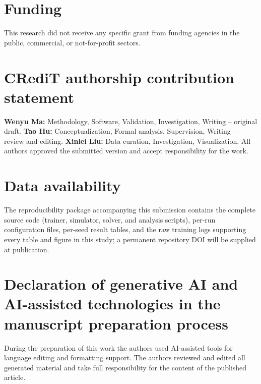 \documentclass[preprint,12pt]{elsarticle}
\begin{document}
\section*{Funding}
This research did not receive any specific grant from funding agencies in the public, commercial, or not-for-profit sectors.

\section*{CRediT authorship contribution statement}
\textbf{Wenyu Ma:} Methodology, Software, Validation, Investigation, Writing -- original draft.
\textbf{Tao Hu:} Conceptualization, Formal analysis, Supervision, Writing -- review and editing.
\textbf{Xinlei Liu:} Data curation, Investigation, Visualization.
All authors approved the submitted version and accept responsibility for the work.

\section*{Data availability}
The reproducibility package accompanying this submission contains the complete source code (trainer, simulator, solver, and analysis scripts), per-run configuration files, per-seed result tables, and the raw training logs supporting every table and figure in this study; a permanent repository DOI will be supplied at publication.

\section*{Declaration of generative AI and AI-assisted technologies in the manuscript preparation process}
During the preparation of this work the authors used AI-assisted tools for language editing and formatting support. The authors reviewed and edited all generated material and take full responsibility for the content of the published article.



\end{document}
